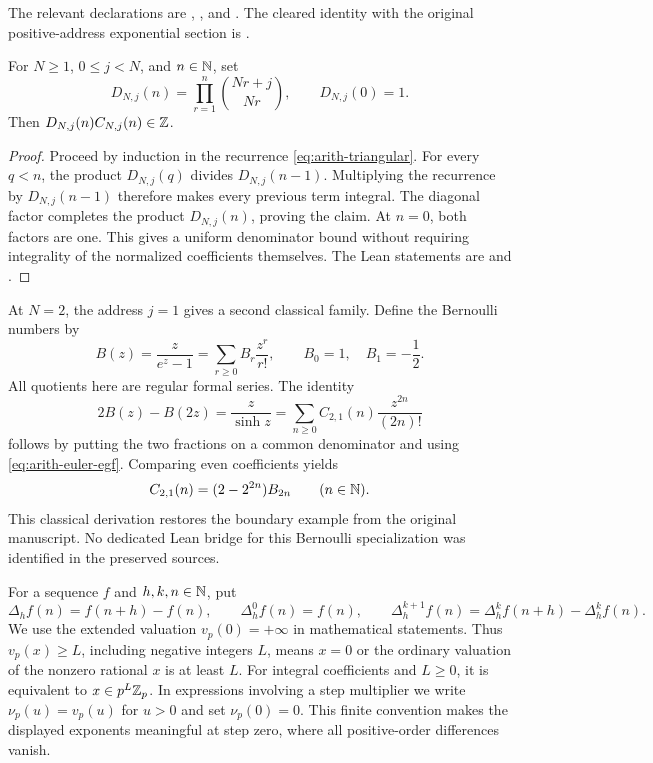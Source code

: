 The relevant declarations are
,
, and
.
The cleared identity with the original positive-address exponential section
is .

\begin{proposition}
\label{prop:arith-denominator}
For $N\ge1$, $0\le j<N$, and $n\in\mathbb N$, set
\[
 D_{N,j}(n)=\prod_{r=1}^{n}\binom{Nr+j}{Nr},\qquad D_{N,j}(0)=1.
\]
Then $D_{N,j}(n)C_{N,j}(n)\in\mathbb Z$.
\end{proposition}

\begin{proof}
Proceed by induction in the recurrence \eqref{eq:arith-triangular}.
For every $q<n$, the product $D_{N,j}(q)$ divides $D_{N,j}(n-1)$.
Multiplying the recurrence by $D_{N,j}(n-1)$ therefore makes every
previous term integral.  The diagonal factor completes the product
$D_{N,j}(n)$, proving the claim.  At $n=0$, both factors are one.
This gives a uniform denominator bound without requiring integrality of
the normalized coefficients themselves.  The Lean statements are
 and
.
\end{proof}

\begin{example}\label{ex:arith-bernoulli}
At $N=2$, the address $j=1$ gives a second classical family.  Define the
Bernoulli numbers by
\[
 B(z)=\frac{z}{e^z-1}=\sum_{r\ge0}B_r\frac{z^r}{r!},
 \qquad B_0=1,\quad B_1=-\frac12.
\]
All quotients here are regular formal series.  The identity
\[
 2B(z)-B(2z)=\frac{z}{\sinh z}
            =\sum_{n\ge0}C_{2,1}(n)\frac{z^{2n}}{(2n)!}
\]
follows by putting the two fractions on a common denominator and using
\eqref{eq:arith-euler-egf}.  Comparing even coefficients yields
\[
 C_{2,1}(n)=(2-2^{2n})B_{2n}\qquad(n\in\mathbb N).
\]
This classical derivation restores the boundary example from the original
manuscript.  No dedicated Lean bridge for this Bernoulli specialization
was identified in the preserved sources.
\end{example}

\begin{definition}\label{def:arith-precision}
For a sequence $f$ and $h,k,n\in\mathbb N$, put
\[
 \Delta_h f(n)=f(n+h)-f(n),\qquad
 \Delta_h^0 f(n)=f(n),\qquad
 \Delta_h^{k+1}f(n)=\Delta_h^k f(n+h)-\Delta_h^k f(n).
\]
We use the extended valuation $v_p(0)=+\infty$ in mathematical statements.
Thus $v_p(x)\ge L$, including negative integers $L$, means
$x=0$ or the ordinary valuation of the nonzero rational $x$ is at least $L$.
For integral coefficients and $L\ge0$, it is equivalent to
$x\in p^L\mathbb Z_p$.  In expressions involving a step multiplier we write
$\nu_p(u)=v_p(u)$ for $u>0$ and set $\nu_p(0)=0$.  This finite convention
makes the displayed exponents meaningful at step zero, where all
positive-order differences vanish.
\end{definition}

